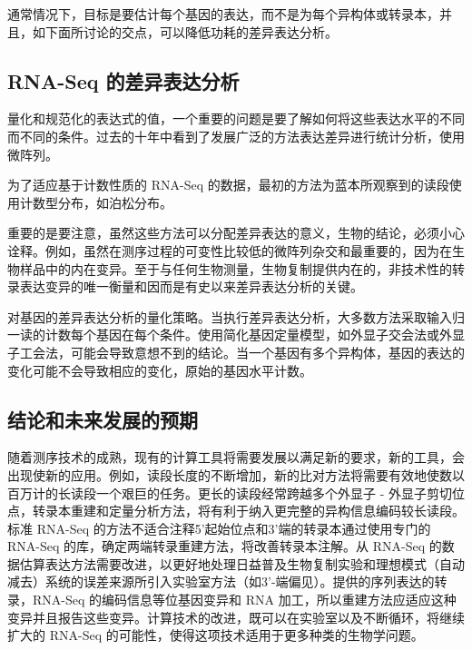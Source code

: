 通常情况下，目标是要估计每个基因的表达，而不是为每个异构体或转录本，并且，如下面所讨论的交点，可以降低功耗的差异表达分析。

\subsection{RNA-Seq 的差异表达分析}

量化和规范化的表达式的值，一个重要的问题是要了解如何将这些表达水平的不同而不同的条件。过去的十年中看到了发展广泛的方法表达差异进行统计分析，使用微阵列。

为了适应基于计数性质的 RNA-Seq 的数据，最初的方法为蓝本所观察到的读段使用计数型分布，如泊松分布。

重要的是要注意，虽然这些方法可以分配差异表达的意义，生物的结论，必须小心诠释。例如，虽然在测序过程的可变性比较低的微阵列杂交和最重要的，因为在生物样品中的内在变异。至于与任何生物测量，生物复制提供内在的，非技术性的转录表达变异的唯一衡量和因而是有史以来差异表达分析的关键。

对基因的差异表达分析的量化策略。当执行差异表达分析，大多数方法采取输入归一读的计数每个基因在每个条件。使用简化基因定量模型，如外显子交会法或外显子工会法，可能会导致意想不到的结论。当一个基因有多个异构体，基因的表达的变化可能不会导致相应的变化，原始的基因水平计数。

\subsection{结论和未来发展的预期}

随着测序技术的成熟，现有的计算工具将需要发展以满足新的要求，新的工具，会出现使新的应用。例如，读段长度的不断增加，新的比对方法将需要有效地使数以百万计的长读段一个艰巨的任务。更长的读段经常跨越多个外显子 - 外显子剪切位点，转录本重建和定量分析方法，将有利于纳入更完整的异构信息编码较长读段。标准 RNA-Seq 的方法不适合注释5'起始位点和3'端的转录本通过使用专门的 RNA-Seq 的库，确定两端转录重建方法，将改善转录本注解。从 RNA-Seq 的数据估算表达方法需要改进，以更好地处理日益普及生物复制实验和理想模式（自动减去）系统的误差来源所引入实验室方法（如3'-端偏见）。提供的序列表达的转录，RNA-Seq 的编码信息等位​​基因变异和 RNA 加工，所以重建方法应适应这种变异并且报告这些变异。计算技术的改进，既可以在实验室以及不断循环，将继续扩大的 RNA-Seq 的可能性，使得这项技术适用于更多种类的生物学问题。





